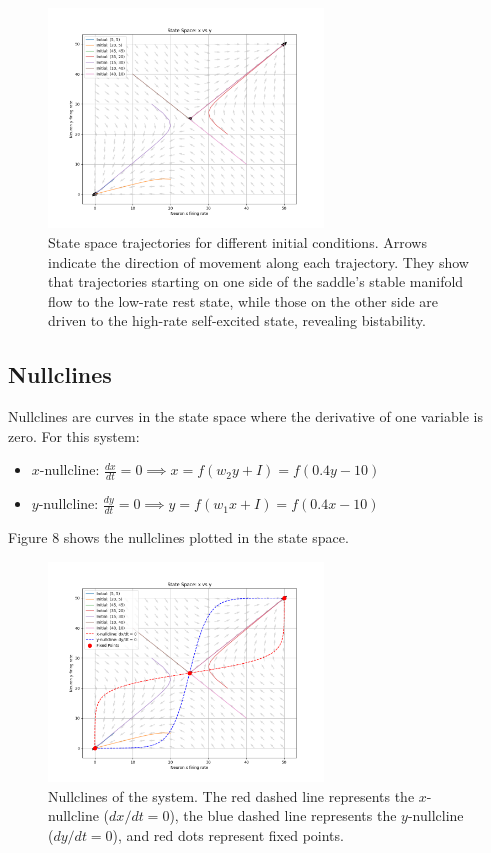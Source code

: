 \documentclass{article}
\begin{document}
\begin{figure}[H]
    \centering
    \includegraphics[width=0.65\textwidth]{state_space2.png}
    \caption{State space trajectories for different initial conditions. Arrows indicate the direction of movement along each trajectory. They show that trajectories starting on one side of the saddle’s stable manifold flow to the low-rate rest state, while those on the other side are driven to the high-rate self-excited state, revealing bistability.}
    \label{fig:state_space}
\end{figure}

\subsection{Nullclines}

Nullclines are curves in the state space where the derivative of one variable is zero. For this system:
\begin{itemize}
    \item $x$-nullcline: $\frac{dx}{dt} = 0 \implies x = f(w_2 y + I) = f(0.4y - 10)$
    \item $y$-nullcline: $\frac{dy}{dt} = 0 \implies y = f(w_1 x + I) = f(0.4x - 10)$
\end{itemize}

Figure 8 shows the nullclines plotted in the state space.

\begin{figure}[H]
    \centering
    \includegraphics[width=0.65\textwidth]{state_space2_fixed_points.png}
    \caption{Nullclines of the system. The red dashed line represents the $x$-nullcline ($dx/dt = 0$), the blue dashed line represents the $y$-nullcline ($dy/dt = 0$), and red dots represent fixed points. }
    \label{fig:nullclines}
\end{figure}
\end{document}

